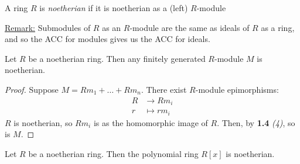 \documentclass[10pt,a4paper]{article}
\begin{document}
\begin{definition}
A ring $R$ is \emph{noetherian} if it is noetherian as a (left) $R$-module
\end{definition}

\underline{Remark:}  Submodules of $R$ as an $R$-module are the same as ideals of $R$ as a ring, and so the ACC for modules gives us the ACC for ideals.

\begin{lemma}
Let $R$ be a noetherian ring. Then any finitely generated $R$-module $M$ is noetherian.
\end{lemma}
\begin{proof}
  Suppose $M = Rm_1 + \ldots + Rm_n$. There exist $R$-module epimorphisms:
  \begin{align*}
    R &\to Rm_i\\
    r &\mapsto rm_i
  \end{align*}
  $R$ is noetherian, so $Rm_i$ is as the homomorphic image of $R$. Then, by \textbf{1.4} \textit{(4)}, so is $M$.
\end{proof}
\begin{theorem}
  Let $R$ be a noetherian ring. Then the polynomial ring $R[x]$ is noetherian.
\end{theorem}
\end{document}
